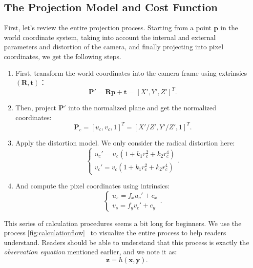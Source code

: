 \subsection{The Projection Model and Cost Function}
First, let's review the entire projection process. Starting from a point $\mathbf{p}$ in the world coordinate system, taking into account the internal and external parameters and distortion of the camera, and finally projecting into pixel coordinates, we get the following steps.

\begin{enumerate}
	\item First, transform the world coordinates into the camera frame using extrinsics $(\mathbf{R}, \mathbf{t})$：
	\begin{equation}
		\mathbf{P}' = \mathbf{R} \mathbf{p} + \mathbf{t} = [X', Y', Z']^T.
	\end{equation}
	\item Then, project $\mathbf{P}'$ into the normalized plane and get the normalized coordinates: 
	\begin{equation}
		\mathbf{P}_c = [u_c, v_c, 1]^T = [X'/Z', Y'/Z', 1]^T.
	\end{equation}
	\item Apply the distortion model. We only consider the radical distortion here: 
	\begin{equation}
		\left\{
		\begin{array}{l}
			u_c' = {u_c}\left( {1 + {k_1}r_c^2 + {k_2}r_c^4} \right)\\
			v_c' = {v_c}\left( {1 + {k_1}r_c^2 + {k_2}r_c^4} \right)
		\end{array}
		\right. .
	\end{equation}
	\item And compute the pixel coordinates using intrinsics:
	\begin{equation}
		\left\{ \begin{array}{l}
			{u_s} = {f_x}u_c' + {c_x}\\
			{v_s} = {f_y}v_c' + {c_y} 
		\end{array} \right. .
	\end{equation}
\end{enumerate}

This series of calculation procedures seems a bit long for beginners. We use the process \autoref{fig:calculationflow}~ to visualize the entire process to help readers understand. Readers should be able to understand that this process is exactly the \textit{observation equation} mentioned earlier, and we note it as:
\begin{equation}
	\mathbf{z} = h(\mathbf{x}, \mathbf{y}).
\end{equation}

